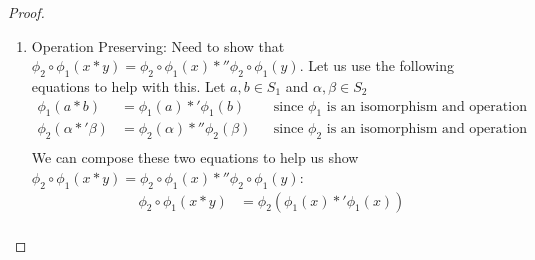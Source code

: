 \documentclass{article}
\begin{document}
\begin{enumerate}
{\begin{proof}
\begin{enumerate}[1.]
\begin{align*}
                          y                                & = \phi_2 \circ \phi_1(x)                                                                                                                           \\
                          \phi_2^{-1}(y)                   & = \phi_2^{-1} \circ \phi_2 \circ \phi_1(x)                   &  & \text{since $\phi_2$ is bijective, and has a well-defined inverse $\phi_2^{-1}$} \\
                          \phi_1^{-1} \circ \phi_2^{-1}(y) & = \phi_1^{-1} \circ \phi_2^{-1} \circ \phi_2 \circ \phi_1(x) &  & \text{since $\phi_1$ is bijective, and has a well-defined inverse $\phi_1^{-1}$} \\
                          \phi_1^{-1} \circ \phi_2^{-1}(y) & = \phi_1^{-1} \circ \phi_1(x)                                                                                                                      \\
                          \phi_1^{-1} \circ \phi_2^{-1}(y) & = x                                                                                                                                                \\
                      \end{align*}
                      Choose $x = \phi_1^{-1} \circ \phi_2^{-1}(y)$. Thus $\phi_2 \circ \phi_1$ is onto.
                \item Operation Preserving: Need to show that $\phi_2 \circ \phi_1(x*y)=\phi_2 \circ \phi_1(x)*''\phi_2 \circ \phi_1(y)$. Let us use the following equations to help with this. Let $a,b \in S_1$ and $\alpha,\beta \in S_2$
                      \begin{align*}
                          \phi_1(a*b)           & = \phi_1(a) *' \phi_1(b)           &  & \text{since $\phi_1$ is an isomorphism and operation preserving} \\
                          \phi_2(\alpha*'\beta) & = \phi_2(\alpha) *'' \phi_2(\beta) &  & \text{since $\phi_2$ is an isomorphism and operation preserving} \\
                      \end{align*}
                      We can compose these two equations to help us show $\phi_2 \circ \phi_1(x*y)=\phi_2 \circ \phi_1(x)*''\phi_2 \circ \phi_1(y)$:
                      \begin{align*}
                          \phi_2 \circ \phi_1(x*y) & = \phi_2(\phi_1(x) *' \phi_1(x))                  \\

\end{align*}
\end{enumerate}
\end{proof}}
\end{enumerate}
\end{document}
